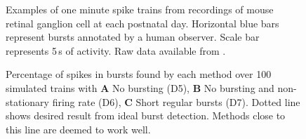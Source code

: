 \documentclass[12pt, titlepage]{article}
\begin{document}
		\begin{figure}
			\centering
			\caption{Examples of one minute spike trains from recordings of mouse retinal ganglion cell at each postnatal day. Horizontal blue bars represent bursts annotated by a human observer. Scale bar represents 5$\,$s of activity. Raw data available from \protect\cite{Eglen2014a}.}
			\label{RGC_eg}
		\end{figure}
		\begin{figure}[h]
			\centering
			\caption{Percentage of spikes in bursts found by each method over 100 simulated trains with \textbf{A} No bursting (D5), \textbf{B}  No bursting and non-stationary firing rate (D6), \textbf{C} Short regular bursts (D7). Dotted line shows desired result from ideal burst detection. Methods close to this line are deemed to work well.}
			\label{sim_results1}
		\end{figure}
\end{document}
